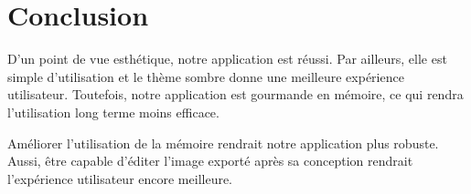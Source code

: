 
\chapter{Conclusion}
\label{s:conclusion}



D'un point de vue esthétique, notre application est réussi.
Par ailleurs, elle est simple d'utilisation et le thème sombre donne une meilleure expérience utilisateur.
Toutefois, notre application est gourmande en mémoire, ce qui rendra l'utilisation long terme moins efficace.

Améliorer l'utilisation de la mémoire rendrait notre application plus robuste. 
Aussi, être capable d'éditer l'image exporté après sa conception rendrait l'expérience utilisateur encore meilleure.
